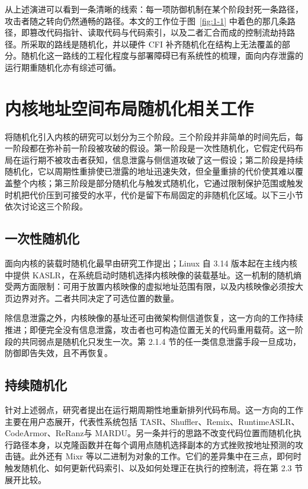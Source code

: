 从上述演进可以看到一条清晰的线索：每一项防御机制在某个阶段封死一条路径，攻击者随之转向仍然通畅的路径。本文的工作位于图~\ref{fig:1-1} 中着色的那几条路径，即篡改代码指针、读取代码与代码索引，以及二者汇合而成的控制流劫持路径。所采取的路线是随机化，并以硬件 CFI 补齐随机化在结构上无法覆盖的部分。随机化这一路线的工程化程度与部署障碍已有系统性的梳理\citep{larsen2020adoption}，面向内存泄露的运行期重随机化亦有综述可循\citep{shen2019survey}。

\section{内核地址空间布局随机化相关工作}

将随机化引入内核的研究可以划分为三个阶段。三个阶段并非简单的时间先后，每一阶段都在弥补前一阶段被攻破的假设。第一阶段是一次性随机化，它假定代码布局在运行期不被攻击者获知，信息泄露与侧信道攻破了这一假设；第二阶段是持续随机化，它以周期性重排使已泄露的地址迅速失效，但全量重排的代价使其难以覆盖整个内核；第三阶段是部分随机化与触发式随机化，它通过限制保护范围或触发时机把代价压到可接受的水平，代价是留下布局固定的非随机化区域。以下三小节依次讨论这三个阶段。

\subsection{一次性随机化}

面向内核的装载时随机化最早由研究工作提出\citep{stanley2013improved}；Linux 自 3.14 版本起在主线内核中提供 KASLR\citep{linux2024kernel}，在系统启动时随机选择内核映像的装载基址。这一机制的随机熵受两方面限制：可用于放置内核映像的虚拟地址范围有限，以及内核映像必须按大页边界对齐。二者共同决定了可选位置的数量。

除信息泄露之外，内核映像的基址还可由微架构侧信道恢复，这一方向的工作持续推进\citep{gruss2017kaiser,canella2020kaslr}；即便完全没有信息泄露，攻击者也可构造位置无关的代码重用载荷\citep{goktas2018pir}。这一阶段的共同弱点是随机化只发生一次。第 2.1.4 节的任一类信息泄露手段一旦成功，防御即告失效，且不再恢复。

\subsection{持续随机化}

针对上述弱点，研究者提出在运行期周期性地重新排列代码布局。这一方向的工作主要在用户态展开，代表性系统包括 TASR\citep{bigelow2015tasr}、Shuffler\citep{williams2016shuffler}、Remix\citep{chen2016remix}、RuntimeASLR\citep{lu2016runtimeaslr}、CodeArmor\citep{chen2017codearmor}、ReRanz\citep{wang2017reranz}与 MARDU\citep{jelesnianski2020mardu}。另一条并行的思路不改变代码位置而随机化执行路径本身，以克隆函数并在每个调用点随机选择副本的方式挫败按地址预测的攻击链\citep{davi2015isomeron}。此外还有 Mixr\citep{hawkins2017mixr} 等以二进制为对象的工作。它们的差异集中在三点，即何时触发随机化、如何更新代码索引、以及如何处理正在执行的控制流，将在第 2.3 节展开比较。

